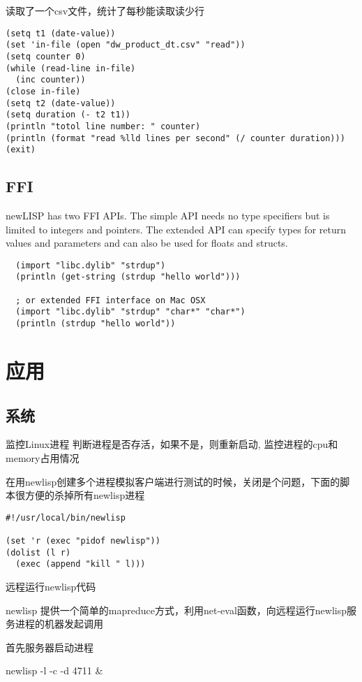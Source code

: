 \documentclass[cn,11pt]{elegantbook}
\begin{document}
读取了一个csv文件，统计了每秒能读取读少行
\begin{lstlisting}
(setq t1 (date-value))
(set 'in-file (open "dw_product_dt.csv" "read"))
(setq counter 0)
(while (read-line in-file)
  (inc counter))
(close in-file)
(setq t2 (date-value))
(setq duration (- t2 t1))
(println "totol line number: " counter)
(println (format "read %lld lines per second" (/ counter duration)))
(exit)
 \end{lstlisting}

\subsection{FFI}
newLISP has two FFI APIs. The simple API needs no type specifiers but is limited to integers and pointers. The extended API can specify types for return values and parameters and can also be used for floats and structs.

\begin{lstlisting}
  (import "libc.dylib" "strdup")
  (println (get-string (strdup "hello world")))

  ; or extended FFI interface on Mac OSX
  (import "libc.dylib" "strdup" "char*" "char*")
  (println (strdup "hello world"))
\end{lstlisting}

\section{应用}
\subsection{系统}
监控Linux进程
判断进程是否存活，如果不是，则重新启动, 监控进程的cpu和memory占用情况


在用newlisp创建多个进程模拟客户端进行测试的时候，关闭是个问题，下面的脚本很方便的杀掉所有newlisp进程

\begin{lstlisting}[lisp]
#!/usr/local/bin/newlisp

(set 'r (exec "pidof newlisp"))
(dolist (l r)
  (exec (append "kill " l)))
\end{lstlisting}

远程运行newlisp代码

newlisp 提供一个简单的mapreduce方式，利用net-eval函数，向远程运行newlisp服务进程的机器发起调用

首先服务器启动进程

newlisp -l -c -d 4711 &
\end{document}
